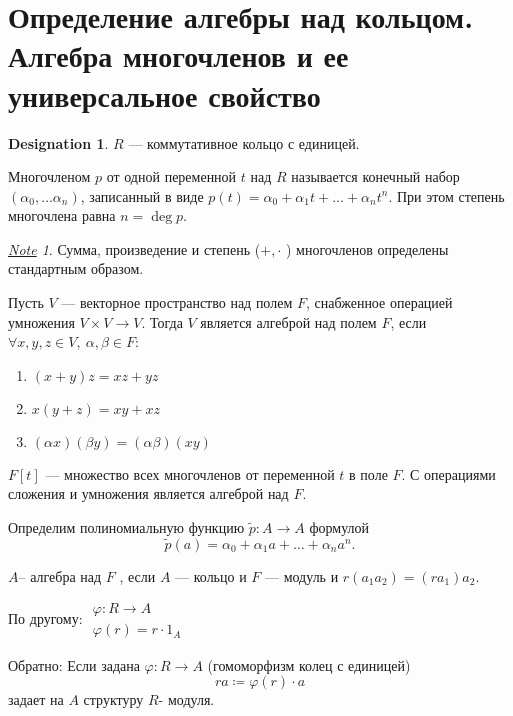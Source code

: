 \documentclass[11pt]{book}
\theoremstyle{definition}
\theoremstyle{plain}
\theoremstyle{plain}
\theoremstyle{definition}
\newtheorem*{name}{Designation}
\theoremstyle{remark}
\newtheorem*{note}{\underline{Note}}
\begin{document}
 \section{Определение алгебры над кольцом. Алгебра многочленов и ее универсальное свойство}
 \begin{name}
     $ R$ --- коммутативное кольцо с единицей.
 \end{name}
 \begin{defn}
     {\sf Многочленом  $ p$ от одной переменной $ t$ над $ R$} называется конечный набор $ ( \alpha _0, \ldots  \alpha _n)$, записанный в виде $p(t) =  \alpha _0 + \alpha _1 t + \ldots + \alpha _n t^{n}$. При этом {\sf степень многочлена} равна $ n = \deg p$.
 \end{defn}
 \begin{note}
     Сумма, произведение и степень ($ +, \cdot$ ) многочленов определены стандартным образом.
 \end{note}
 \begin{defn}
     Пусть $ V$ --- векторное пространство над полем  $ F$, снабженное операцией умножения  $ V \times V \to  V$. Тогда $ V$ является {\sf алгеброй над полем $ F$}, если  $ \forall x, y, z \in V, ~\alpha, \beta \in F$:
     \begin{enumerate}[noitemsep]
	 \item $ (x+y) z = xz+ yz$
	 \item  $ x (y + z) = xy + xz$
	 \item  $ (\alpha x)(\beta y) = (\alpha \beta)(xy)$
     \end{enumerate}
 \end{defn}
 \begin{defn}
     $ F[t]$ --- {\sf множество всех многочленов} от переменной $ t$ в поле $ F$. С операциями сложения и умножения  является алгеброй над $ F$.
 \end{defn}
 Определим полиномиальную функцию $ \tilde p: A \to  A$ формулой
  \[
      \tilde p(a) = \alpha_0 + \alpha_1 a + \ldots + \alpha_n a^{n}
 .\] 
 \begin{defn}
     $ A $-- алгебра над $ F$ , если $ A$ --- кольцо и  $ F$  --- модуль и $ r(a_1 a_2) = (r a_1) a_2$.

     По другому:
     $ 
     \begin{array}{l}
\varphi : R \to  A \\
\varphi (r) = r \cdot 1_A
     \end{array}
     $

     Обратно:
     Если задана $ \varphi : R \to  A$ (гомоморфизм колец с единицей) \[
	 ra \coloneqq \varphi (r) \cdot a
     \] 
     задает на $ A$ структуру $ R$- модуля.
 \end{defn}
\end{document}
